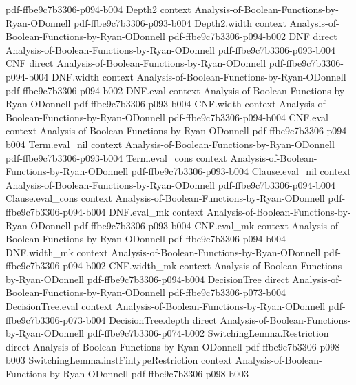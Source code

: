 \begin{theorem}
  {pdf-ffbe9c7b3306-p094-b004}
\proofstep
  {Depth2}
  {context}
  {Analysis-of-Boolean-Functions-by-Ryan-ODonnell}
  {pdf-ffbe9c7b3306-p093-b004}
\proofstep
  {Depth2.width}
  {context}
  {Analysis-of-Boolean-Functions-by-Ryan-ODonnell}
  {pdf-ffbe9c7b3306-p094-b002}
\proofstep
  {DNF}
  {direct}
  {Analysis-of-Boolean-Functions-by-Ryan-ODonnell}
  {pdf-ffbe9c7b3306-p093-b004}
\proofstep
  {CNF}
  {direct}
  {Analysis-of-Boolean-Functions-by-Ryan-ODonnell}
  {pdf-ffbe9c7b3306-p094-b004}
\proofstep
  {DNF.width}
  {context}
  {Analysis-of-Boolean-Functions-by-Ryan-ODonnell}
  {pdf-ffbe9c7b3306-p094-b002}
\proofstep
  {DNF.eval}
  {context}
  {Analysis-of-Boolean-Functions-by-Ryan-ODonnell}
  {pdf-ffbe9c7b3306-p093-b004}
\proofstep
  {CNF.width}
  {context}
  {Analysis-of-Boolean-Functions-by-Ryan-ODonnell}
  {pdf-ffbe9c7b3306-p094-b004}
\proofstep
  {CNF.eval}
  {context}
  {Analysis-of-Boolean-Functions-by-Ryan-ODonnell}
  {pdf-ffbe9c7b3306-p094-b004}
\proofstep
  {Term.eval_nil}
  {context}
  {Analysis-of-Boolean-Functions-by-Ryan-ODonnell}
  {pdf-ffbe9c7b3306-p093-b004}
\proofstep
  {Term.eval_cons}
  {context}
  {Analysis-of-Boolean-Functions-by-Ryan-ODonnell}
  {pdf-ffbe9c7b3306-p093-b004}
\proofstep
  {Clause.eval_nil}
  {context}
  {Analysis-of-Boolean-Functions-by-Ryan-ODonnell}
  {pdf-ffbe9c7b3306-p094-b004}
\proofstep
  {Clause.eval_cons}
  {context}
  {Analysis-of-Boolean-Functions-by-Ryan-ODonnell}
  {pdf-ffbe9c7b3306-p094-b004}
\proofstep
  {DNF.eval_mk}
  {context}
  {Analysis-of-Boolean-Functions-by-Ryan-ODonnell}
  {pdf-ffbe9c7b3306-p093-b004}
\proofstep
  {CNF.eval_mk}
  {context}
  {Analysis-of-Boolean-Functions-by-Ryan-ODonnell}
  {pdf-ffbe9c7b3306-p094-b004}
\proofstep
  {DNF.width_mk}
  {context}
  {Analysis-of-Boolean-Functions-by-Ryan-ODonnell}
  {pdf-ffbe9c7b3306-p094-b002}
\proofstep
  {CNF.width_mk}
  {context}
  {Analysis-of-Boolean-Functions-by-Ryan-ODonnell}
  {pdf-ffbe9c7b3306-p094-b004}
\proofstep
  {DecisionTree}
  {direct}
  {Analysis-of-Boolean-Functions-by-Ryan-ODonnell}
  {pdf-ffbe9c7b3306-p073-b004}
\proofstep
  {DecisionTree.eval}
  {context}
  {Analysis-of-Boolean-Functions-by-Ryan-ODonnell}
  {pdf-ffbe9c7b3306-p073-b004}
\proofstep
  {DecisionTree.depth}
  {direct}
  {Analysis-of-Boolean-Functions-by-Ryan-ODonnell}
  {pdf-ffbe9c7b3306-p074-b002}
\proofstep
  {SwitchingLemma.Restriction}
  {direct}
  {Analysis-of-Boolean-Functions-by-Ryan-ODonnell}
  {pdf-ffbe9c7b3306-p098-b003}
\proofstep
  {SwitchingLemma.instFintypeRestriction}
  {context}
  {Analysis-of-Boolean-Functions-by-Ryan-ODonnell}
  {pdf-ffbe9c7b3306-p098-b003}

\end{theorem}

